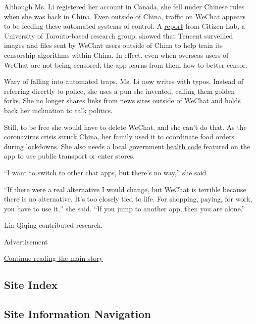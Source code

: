 Although Ms. Li registered her account in Canada, she fell under Chinese
rules when she was back in China. Even outside of China, traffic on
WeChat appears to be feeding these automated systems of control. A
\href{https://citizenlab.ca/2020/05/wechat-surveillance-explained/}{report}
from Citizen Lab, a University of Toronto-based research group, showed
that Tencent surveilled images and files sent by WeChat users outside of
China to help train its censorship algorithms within China. In effect,
even when overseas users of WeChat are not being censored, the app
learns from them how to better censor.

Wary of falling into automated traps, Ms. Li now writes with typos.
Instead of referring directly to police, she uses a pun she invented,
calling them golden forks. She no longer shares links from news sites
outside of WeChat and holds back her inclination to talk politics.

Still, to be free she would have to delete WeChat, and she can't do
that. As the coronavirus crisis struck China,
\href{https://www.nytimes3xbfgragh.onion/2020/02/15/business/china-coronavirus-lockdown.html}{her
family used it} to coordinate food orders during lockdowns. She also
needs a local government
\href{https://www.nytimes3xbfgragh.onion/2020/03/01/business/china-coronavirus-surveillance.html}{health
code} featured on the app to use public transport or enter stores.

``I want to switch to other chat apps, but there's no way,'' she said.

``If there were a real alternative I would change, but WeChat is
terrible because there is no alternative. It's too closely tied to life.
For shopping, paying, for work, you have to use it,'' she said. ``If you
jump to another app, then you are alone.''

Lin Qiqing contributed research.

Advertisement

\protect\hyperlink{after-bottom}{Continue reading the main story}

\hypertarget{site-index}{%
\subsection{Site Index}\label{site-index}}

\hypertarget{site-information-navigation}{%
\subsection{Site Information
Navigation}\label{site-information-navigation}}

